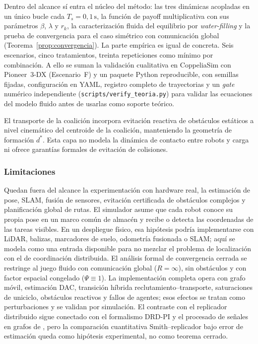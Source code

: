 Dentro del alcance sí entra el núcleo del método: las tres dinámicas acopladas en un
único bucle cada $T_s = 0{,}1\,\text{s}$, la función de payoff multiplicativa con sus
parámetros $\beta$, $\lambda$ y $r_k$, la caracterización fluida del equilibrio por
\emph{water-filling} y la prueba de convergencia para el caso simétrico con comunicación
global (Teorema~\ref{prop:convergencia}). La parte empírica es igual de concreta. Seis
escenarios, cinco tratamientos, treinta repeticiones como mínimo por combinación. A ello
se suman la validación cualitativa en CoppeliaSim con Pioneer~3-DX (Escenario~F) y un
paquete Python reproducible, con semillas fijadas, configuración en YAML, registro
completo de trayectorias y un \emph{gate} numérico independiente
(\texttt{scripts/verify\_teoria.py}) para validar las ecuaciones del modelo fluido antes
de usarlas como soporte teórico.

El transporte de la coalición incorpora evitación reactiva de obstáculos estáticos a
nivel cinemático del centroide de la coalición, manteniendo la geometría de formación
$d^*$. Esta capa no modela la dinámica de contacto entre robots y carga ni ofrece
garantías formales de evitación de colisiones.

\subsubsection{Limitaciones}

Quedan fuera del alcance la experimentación con hardware real, la estimación de pose,
SLAM, fusión de sensores, evitación certificada de obstáculos complejos y planificación
global de rutas. El simulador asume que cada robot conoce su propia pose en un marco
común de almacén y recibe o detecta las coordenadas de las tareas visibles. En un
despliegue físico, esa hipótesis podría implementarse con LiDAR, balizas, marcadores de
suelo, odometría fusionada o SLAM; aquí se modela como una entrada disponible para no
mezclar el problema de localización con el de coordinación distribuida.
El análisis formal de convergencia cerrada se restringe al juego fluido con
comunicación global ($R = \infty$), sin obstáculos y con factor espacial congelado
($\Psi\equiv1$). La implementación completa opera con grafo móvil, estimación DAC,
transición híbrida reclutamiento--transporte, saturaciones de uniciclo, obstáculos
reactivos y fallos de agentes; esos efectos se tratan como perturbaciones y se validan
por simulación. El contraste con el replicador distribuido sigue conectado con el
formalismo DRD-PI y el procesado de señales en grafos de \citet{sandryhaila2013dsp},
pero la comparación cuantitativa Smith--replicador bajo error de estimación queda como
hipótesis experimental, no como teorema cerrado.

